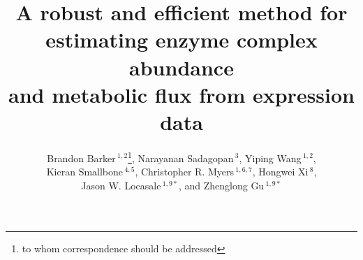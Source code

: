 \documentclass[draft]{bioinfo}
\newcommand*{\commonDir}{./common/}   %
\begin{document}

\renewcommand{\figurename}{\textbf{Fig.}}
\captionsetup{belowskip=0pt}









\title[FALCON]{A robust and efficient method for\\ 
estimating enzyme complex abundance\\ 
and metabolic flux from expression data}
  \author[Barker \textit{et~al.}]{Brandon Barker\,$^{1,2}$\footnote{to whom correspondence should be addressed},
    Narayanan Sadagopan\,$^{3}$, Yiping Wang\,$^{1,2}$, \\
    Kieran Smallbone\,$^{4,5}$, Christopher R. Myers\,$^{1,6,7}$, Hongwei Xi\,$^{8}$, \\ 
    Jason W. Locasale\,$^{1,9*}$, and Zhenglong Gu\,$^{1,9*}$\\
 }

\address{$^{1}$Tri-Institutional Training Program in Computational
  Biology and Medicine, 1300 York Avenue, Box 194, New York, NY, USA.
  $^{2}$Department of Biological Statistics and Computational Biology, 
    Cornell University, 1198 Comstock Hall, Ithaca, NY, USA.
  $^{3}$College of Engineering, Cornell University, Carpenter Hall, 
    Ithaca, NY, USA.
  $^{4}$ School of Computer Science, The University of Manchester, Manchester, UK.
  $^{5}$Manchester Center for Integrative Systems Biology, The University of Manchester, Manchester, UK.
  $^{6}$Laboratory of Atomic and Solid State Physics, Cornell University, Ithaca, NY, USA.
  $^{7}$Institute of Biotechnology, Cornell University, Ithaca, NY, USA.
  $^{8}$Department of Computer Science, Boston University,
    111 Cummington Street, Boston, MA, USA.
  $^{9}$Division of Nutritional Sciences, Cornell University, 
    Savage Hall, Ithaca, NY, USA.
  }
\end{document}
